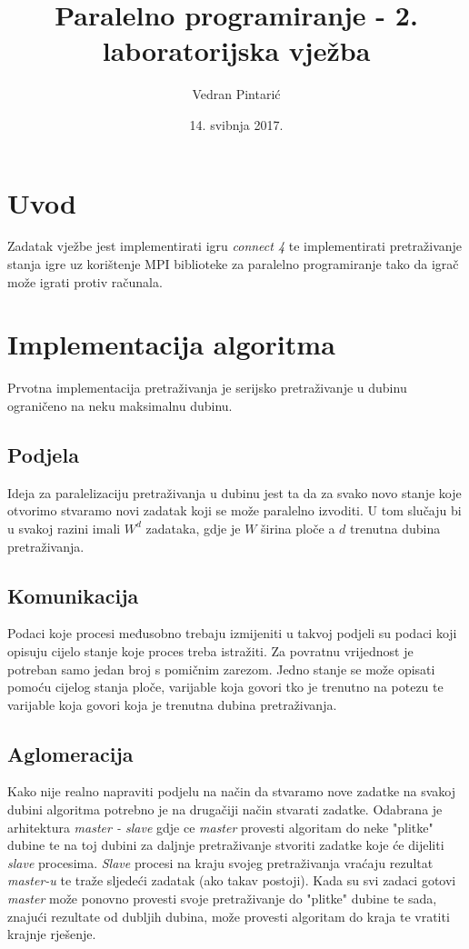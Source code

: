 \documentclass[12pt]{article}
\title{Paralelno programiranje - 2. laboratorijska vježba}
\author{Vedran Pintarić}
\date{14. svibnja 2017.}
\begin{document}
\maketitle

\section{Uvod}
Zadatak vježbe jest implementirati igru \textit{connect 4} te implementirati
pretraživanje stanja igre uz korištenje MPI biblioteke za paralelno programiranje
tako da igrač može igrati protiv računala.

\section{Implementacija algoritma}
Prvotna implementacija pretraživanja je serijsko pretraživanje u dubinu ograničeno
na neku maksimalnu dubinu.

\subsection{Podjela}
Ideja za paralelizaciju pretraživanja u dubinu jest ta da za svako novo stanje koje
otvorimo stvaramo novi zadatak koji se može paralelno izvoditi.
U tom slučaju bi u svakoj razini
imali $W ^ d$ zadataka, gdje je $W$ širina ploče a $d$ trenutna dubina pretraživanja.

\subsection{Komunikacija}
Podaci koje procesi međusobno trebaju izmijeniti u takvoj podjeli su podaci koji opisuju
cijelo stanje koje proces treba istražiti.
Za povratnu vrijednost je potreban samo jedan broj s pomičnim zarezom.
Jedno stanje se može opisati pomoću cijelog stanja ploče, varijable koja govori tko je trenutno
na potezu te varijable koja govori koja je trenutna dubina pretraživanja.

\subsection{Aglomeracija}
Kako nije realno napraviti podjelu na način da stvaramo nove zadatke na svakoj dubini algoritma
potrebno je na drugačiji način stvarati zadatke.
Odabrana je arhitektura \textit{master - slave} gdje ce \textit{master} provesti algoritam
do neke "plitke" dubine te na toj dubini za daljnje pretraživanje stvoriti zadatke 
koje će dijeliti \textit{slave} procesima.
\textit{Slave} procesi na kraju svojeg pretraživanja vraćaju rezultat \textit{master-u} te
traže sljedeći zadatak (ako takav postoji).
Kada su svi zadaci gotovi \textit{master} može ponovno provesti svoje pretraživanje
do "plitke" dubine te sada, znajući rezultate od dubljih dubina, može provesti algoritam
do kraja te vratiti krajnje rješenje.
\end{document}
